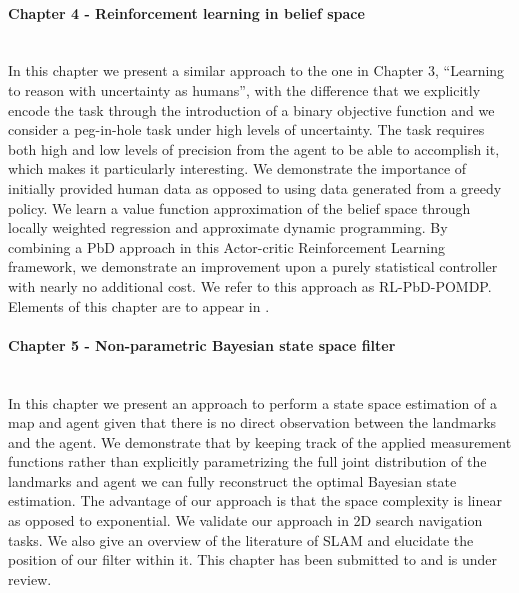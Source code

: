 \begin{minipage}[c]{0.9\textwidth}
\paragraph{Chapter 4 - Reinforcement learning in belief space}\\

In this chapter we present a similar approach to the one in Chapter 3, ``Learning to reason with uncertainty as humans'',
with the difference that we explicitly encode the task through the introduction of a binary objective function and we consider 
a peg-in-hole task under high levels of uncertainty. 
The task requires both high and low levels of precision from the agent to be able to accomplish it, which makes it particularly interesting. 
We demonstrate the importance of initially provided human data as opposed to using data generated from a greedy policy.
We learn a value function approximation of the belief space through locally weighted regression and approximate dynamic programming. By combining a PbD approach in this Actor-critic Reinforcement Learning framework, we demonstrate an improvement upon 
a purely statistical controller with nearly no additional cost. We refer to this approach as RL-PbD-POMDP. Elements of this chapter are to appear 
in \cite{FPI_Chambrier2016}.
\end{minipage}

\begin{minipage}[c]{0.9\textwidth}
\paragraph{Chapter 5 - Non-parametric Bayesian state space filter}\\
In this chapter we present an approach to perform a state space estimation of a map and agent 
given that there is no direct observation between the landmarks and the agent. 
We demonstrate that by keeping track of the applied measurement functions rather than 
explicitly parametrizing the full joint distribution of the landmarks and agent we can fully reconstruct 
the optimal Bayesian state estimation. The advantage of our approach is that the space complexity is linear as opposed 
to exponential. We validate our approach in 2D search navigation tasks.
We also give an overview of the literature of SLAM and elucidate the position of our filter within it. This chapter 
has been submitted to \cite{MLMF_Chambrier2016} and is under review.
\end{minipage}


